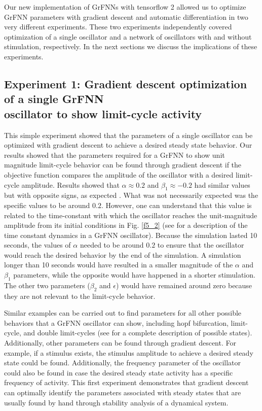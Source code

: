 \documentclass{report}
\begin{document}
Our new implementation of GrFNNs with tensorflow 2 allowed us to optimize GrFNN parameters with gradient descent and automatic differentiation in two very different experiments. These two experiments independently covered optimization of a single oscillator and a network of oscillators with and without stimulation, respectively. In the next sections we discuss the implications of these experiments.

\subsection{Experiment 1: Gradient descent optimization of a single GrFNN \\ oscillator to show limit-cycle activity} 


This simple experiment showed that the parameters of a single oscillator can be optimized with gradient descent to achieve a desired steady state behavior. Our results showed that the parameters required for a GrFNN to show unit magnitude limit-cycle behavior can be found through gradient descent if the objective function compares the amplitude of the oscillator with a desired limit-cycle amplitude. Results showed that $\alpha \approx 0.2$ and $\beta_1 \approx -0.2$ had similar values but with opposite signs, as expected \cite{kim2015signal}. What was not necessarily expected was the specific values to be around $0.2$. However, one can understand that this value is related to the time-constant with which the oscillator reaches the unit-magnitude amplitude from its initial conditions in Fig.{} \ref{f5_2} (see \cite{kim2015signal} for a description of the time constant dynamics in a GrFNN oscillator). Because the simulation lasted 10 seconds, the values of $\alpha$ needed to be around $0.2$ to ensure that the oscillator would reach the desired behavior by the end of the simulation. A simulation longer than 10 seconds would have resulted in a smaller magnitude of the $\alpha$ and $\beta_1$ parameters, while the opposite would have happened in a shorter stimulation. The other two parameters ($\beta_2$ and $\epsilon$) would have remained around zero because they are not relevant to the limit-cycle behavior.

Similar examples can be carried out to find parameters for all other possible behaviors that a GrFNN oscillator can show, including hopf bifurcation, limit-cycle, and double limit-cycles (see \cite{kim2015signal} for a complete description of possible states). Additionally, other parameters can be found through gradient descent. For example, if a stimulus exists, the stimulus amplitude to achieve a desired steady state could be found. Additionally, the frequency parameter of the oscillator could also be found in case the desired steady state activity has a specific frequency of activity. This first experiment demonstrates that gradient descent can optimally identify the parameters associated with steady states that are usually found by hand through stability analysis of a dynamical system. 
\end{document}
